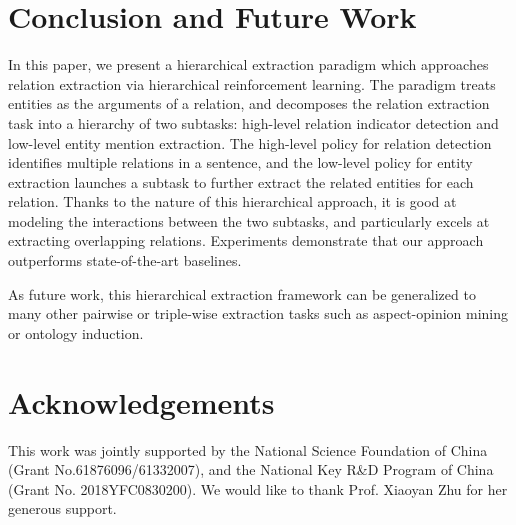 \documentclass[letterpaper]{article} \usepackage{aaai19}  \usepackage{times}  \usepackage{helvet}  \usepackage{courier}  \usepackage{url}  \usepackage{graphicx}  \frenchspacing  \setlength{\pdfpagewidth}{8.5in}  \setlength{\pdfpageheight}{11in}  \usepackage{amsfonts}
\theoremstyle{definition}
\begin{document}
\section{Conclusion and Future Work}
In this paper, we present a hierarchical extraction paradigm which approaches relation extraction via hierarchical reinforcement learning.
The paradigm treats entities as the arguments of a relation, and decomposes the relation extraction task into a hierarchy of two subtasks: high-level relation indicator detection and low-level entity mention extraction. The high-level policy for relation detection identifies multiple relations in a sentence, and the low-level policy for entity extraction launches a subtask to further extract the related entities for each relation. 
Thanks to the nature of this hierarchical approach, it is good at modeling the interactions between the two subtasks, and particularly excels at extracting overlapping relations. 
Experiments demonstrate that our approach outperforms state-of-the-art baselines.

As future work, this hierarchical extraction framework can be generalized to many other pairwise or triple-wise extraction tasks such as aspect-opinion mining or ontology induction.


\section*{Acknowledgements}
This work was jointly supported by the National Science Foundation of China  (Grant No.61876096/61332007), and the National Key R\&D Program of China (Grant No. 2018YFC0830200). We would like to thank Prof. Xiaoyan Zhu for her generous support.



\end{document}
